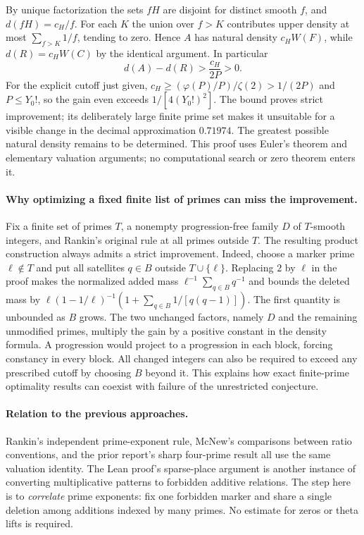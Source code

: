 By unique factorization the sets $fH$ are disjoint for distinct smooth
$f$, and $d(fH)=c_H/f$. For each $K$ the union over $f>K$ contributes
upper density at most $\sum_{f>K}1/f$, tending to zero. Hence $A$ has
natural density $c_H W(F)$, while $d(R)=c_HW(C)$ by the identical
argument. In particular
\[
                         d(A)-d(R)>\frac{c_H}{2P}>0 .
\]
For the explicit cutoff just given, $c_H\ge(\varphi(P)/P)/\zeta(2)>1/(2P)$
and $P\le Y_0!$, so the gain even exceeds $1/[4(Y_0!)^2]$.
The bound proves strict improvement; its deliberately large finite
prime set makes it unsuitable for a visible change in the decimal
approximation $0.71974$. The greatest possible natural density remains
to be determined. This proof uses Euler's theorem and elementary
valuation arguments; no computational search or zero theorem enters it.

\paragraph{Why optimizing a fixed finite list of primes can miss the improvement.}
Fix a finite set of primes $T$, a nonempty progression-free family $D$ of $T$-smooth integers, and Rankin's original rule at all primes outside $T$. The resulting product construction always admits a strict improvement. Indeed, choose a marker prime $\ell\notin T$ and put all satellites $q\in B$ outside $T\cup\{\ell\}$. Replacing $2$ by $\ell$ in the proof makes the normalized added mass $\ell^{-1}\sum_{q\in B}q^{-1}$ and bounds the deleted mass by $\ell(1-1/\ell)^{-1}(1+\sum_{q\in B}1/[q(q-1)])$. The first quantity is unbounded as $B$ grows. The two unchanged factors, namely $D$ and the remaining unmodified primes, multiply the gain by a positive constant in the density formula. A progression would project to a progression in each block, forcing constancy in every block. All changed integers can also be required to exceed any prescribed cutoff by choosing $B$ beyond it. This explains how exact finite-prime optimality results can coexist with failure of the unrestricted conjecture.

\paragraph{Relation to the previous approaches.}
Rankin's independent prime-exponent rule, McNew's comparisons between ratio conventions, and the prior report's sharp four-prime result all use the same valuation identity. The Lean proof's sparse-place argument is another instance of converting multiplicative patterns to forbidden additive relations. The step here is to \emph{correlate} prime exponents: fix one forbidden marker and share a single deletion among additions indexed by many primes. No estimate for zeros or theta lifts is required.
